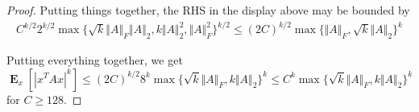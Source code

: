 \documentclass[11pt,a4paper]{article}
\newcommand{\avg}[2]{\mathop{\textbf{E}}_{#1}[#2]}
\newcommand{\mynorm}[1]{\Vert #1 \Vert}
\begin{document}
\begin{proof}
Putting things together, the RHS in the display above may be bounded by
\begin{align*}
C^{k/2}2^{k/2} \max\{\sqrt{k}\mynorm{A}_F\mynorm{A}_2,k\mynorm{A}_2^2,\mynorm{A}_F^2\}^{k/2} \leq (2C)^{k/2} \max\{\mynorm{A}_F,\sqrt{k}\mynorm{A}_2\}^k
\end{align*}

Putting everything together, we get
\[
\avg{x}{|x^TAx|^k} \leq (2C)^{k/2}8^k \max\{\sqrt{k}\mynorm{A}_F,k\mynorm{A}_2\}^k \leq C^k \max\{\sqrt{k}\mynorm{A}_F,k\mynorm{A}_2\}^k
\]
for $C \geq 128$.

\end{proof}
\end{document}
